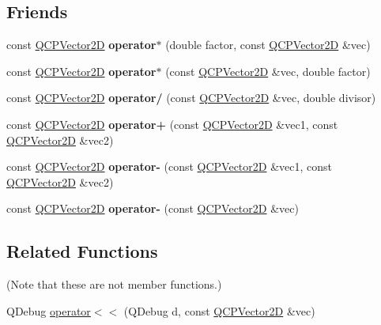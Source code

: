 \subsection*{Friends}
\begin{DoxyCompactItemize}
\item 
\mbox{\label{classQCPVector2D_aa75268fb64b9eaee5448fb815007bee9}} 
const \hyperlink{classQCPVector2D}{Q\+C\+P\+Vector2D} {\bfseries operator$\ast$} (double factor, const \hyperlink{classQCPVector2D}{Q\+C\+P\+Vector2D} \&vec)
\item 
\mbox{\label{classQCPVector2D_aace10d28a76e84e7380ede1a9cb58274}} 
const \hyperlink{classQCPVector2D}{Q\+C\+P\+Vector2D} {\bfseries operator$\ast$} (const \hyperlink{classQCPVector2D}{Q\+C\+P\+Vector2D} \&vec, double factor)
\item 
\mbox{\label{classQCPVector2D_aa69909afc8c656999a2ea292ea01244b}} 
const \hyperlink{classQCPVector2D}{Q\+C\+P\+Vector2D} {\bfseries operator/} (const \hyperlink{classQCPVector2D}{Q\+C\+P\+Vector2D} \&vec, double divisor)
\item 
\mbox{\label{classQCPVector2D_a24cc5985429b12dbed4d0d3c5a917d20}} 
const \hyperlink{classQCPVector2D}{Q\+C\+P\+Vector2D} {\bfseries operator+} (const \hyperlink{classQCPVector2D}{Q\+C\+P\+Vector2D} \&vec1, const \hyperlink{classQCPVector2D}{Q\+C\+P\+Vector2D} \&vec2)
\item 
\mbox{\label{classQCPVector2D_a9e01331d8debf0877ee4cba9abd83605}} 
const \hyperlink{classQCPVector2D}{Q\+C\+P\+Vector2D} {\bfseries operator-\/} (const \hyperlink{classQCPVector2D}{Q\+C\+P\+Vector2D} \&vec1, const \hyperlink{classQCPVector2D}{Q\+C\+P\+Vector2D} \&vec2)
\item 
\mbox{\label{classQCPVector2D_a14c807d345ee3f22d6809bb5a4137b52}} 
const \hyperlink{classQCPVector2D}{Q\+C\+P\+Vector2D} {\bfseries operator-\/} (const \hyperlink{classQCPVector2D}{Q\+C\+P\+Vector2D} \&vec)
\end{DoxyCompactItemize}
\subsection*{Related Functions}
(Note that these are not member functions.) \begin{DoxyCompactItemize}
\item 
Q\+Debug \hyperlink{classQCPVector2D_a6c757af9671d925af4a36c2f58fb7234}{operator$<$$<$} (Q\+Debug d, const \hyperlink{classQCPVector2D}{Q\+C\+P\+Vector2D} \&vec)
\end{DoxyCompactItemize}


